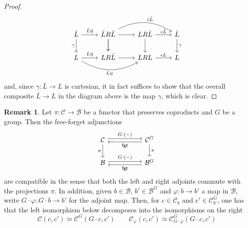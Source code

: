 \documentclass[a4paper,10pt
]{article}%
\numberwithin{equation}{section}
\numberwithin{figure}{section}
\theoremstyle{definition} %
\newtheorem{remark}[equation]{Remark}%
\newcommand{\C}{\ensuremath{\mathcal C}}
\newcommand{\1}{\ensuremath{\mathbbm 1}}%
\begin{document}
\begin{proof}
\begin{equation}
	\begin{tikzcd}
	\bar{L} \ar{d}[swap]{\gamma} \arrow{r}{\bar{L}\bar{\eta}}
	&
	\bar{L} R \bar{L} \arrow[d] \ar{r} \ar{d}
	\arrow[bend left]{rr}{\bar{\epsilon}\bar{L}}
	&
	L R \bar{L} \ar{r}{\epsilon \bar{L}} \ar{d}
	&
	\bar{L} \ar{d}{\gamma}
	\\
	L \arrow{r}{L\bar{\eta}}
	\arrow[bend right]{rr}[swap]{L \eta}
	&
	LR\bar{L} \ar{r}
	&
	LRL \ar{r}{\epsilon L}
	&
	L
	\end{tikzcd}
	\end{equation}
	and, since 
	$\gamma \colon \bar{L} \to L$ is cartesian, 
	it in fact suffices to show that the overall composite 
	$\bar{L} \to L$ in the diagram above
	is the map $\gamma$, which is clear. 
\end{proof}



\begin{remark}
	Let $\pi \colon \mathcal{C} \to \mathcal{B}$
	be a functor that preserves coproducts and $G$ be a group.
	Then the free-forget adjunctions 
	\begin{equation}
	\begin{tikzcd}[column sep =50pt]
	\mathcal{C}
	\arrow[shift left]{r}{G \cdot (-)}
	\arrow[d, "\pi"']
	&
	\mathcal{C}^G 
	\arrow[shift left]{l}{\mathsf{fgt}}
	\arrow[d, "\pi"]
	\\
	\mathcal{B} 
	\arrow[shift left]{r}{G \cdot (-)}
	&
	\mathcal{B}^G
	\arrow[shift left]{l}{\mathsf{fgt}}
	\end{tikzcd}
	\end{equation}
	are compatible in the sense that both the left and right adjoints commute with the projections $\pi$.
	In addition, given $b \in \mathcal{B}$, $b' \in \mathcal{B}^G$
	and $\varphi \colon b \to b'$ a map in $\mathcal{B}$, write
	$G\cdot \varphi \colon G\cdot b \to b'$
	for the adjoint map.
	Then, for $c \in \mathcal{C}_b$ and $c' \in \mathcal{C}^G_{b'}$,
	one has that the left isomorphism below decomposes
	into the isomorphisms on the right
	\begin{equation}\label{ADJOVADJ EQ}
	\C(c,c') 
	\simeq 
	\C^G(G \cdot c,c')\qquad
	\C_{\varphi}(c,c') 
	\simeq 
	\C^G_{G\cdot\varphi}(G \cdot c,c')
	\end{equation}
\end{remark}
\end{document}
